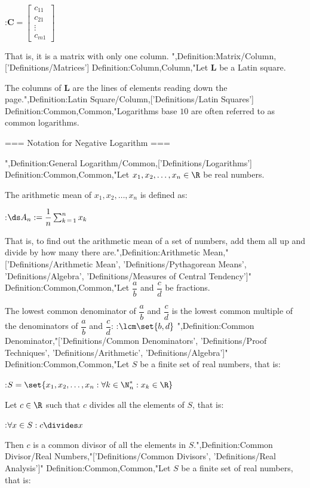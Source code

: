 :$\mathbf C = \begin {bmatrix} c_{1 1} \\ c_{2 1} \\ \vdots \\ c_{m 1} \end {bmatrix}$


That is, it is a matrix with only one column.
",Definition:Matrix/Column,['Definitions/Matrices']
Definition:Column,Column,"Let $\mathbf L$ be a Latin square.

The columns of $\mathbf L$ are the lines of elements reading down the page.",Definition:Latin Square/Column,['Definitions/Latin Squares']
Definition:Common,Common,"Logarithms base $10$ are often referred to as common logarithms.


=== Notation for Negative Logarithm ===

",Definition:General Logarithm/Common,['Definitions/Logarithms']
Definition:Common,Common,"Let $x_1, x_2, \ldots, x_n \in \R$ be real numbers.

The arithmetic mean of $x_1, x_2, \ldots, x_n$ is defined as:

:$\ds A_n := \dfrac 1 n \sum_{k \mathop = 1}^n x_k$

That is, to find out the arithmetic mean of a set of numbers, add them all up and divide by how many there are.",Definition:Arithmetic Mean,"['Definitions/Arithmetic Mean', 'Definitions/Pythagorean Means', 'Definitions/Algebra', 'Definitions/Measures of Central Tendency']"
Definition:Common,Common,"Let $\dfrac a b$ and $\dfrac c d$ be fractions.

The lowest common denominator of $\dfrac a b$ and $\dfrac c d$ is the lowest common multiple of the denominators of $\dfrac a b$ and $\dfrac c d$:
:$\lcm \set {b, d}$
",Definition:Common Denominator,"['Definitions/Common Denominators', 'Definitions/Proof Techniques', 'Definitions/Arithmetic', 'Definitions/Algebra']"
Definition:Common,Common,"Let $S$ be a finite set of real numbers, that is:

:$S = \set {x_1, x_2, \ldots, x_n: \forall k \in \N^*_n: x_k \in \R}$


Let $c \in \R$ such that $c$ divides all the elements of $S$, that is:

:$\forall x \in S: c \divides x$


Then $c$ is a common divisor of all the elements in $S$.",Definition:Common Divisor/Real Numbers,"['Definitions/Common Divisors', 'Definitions/Real Analysis']"
Definition:Common,Common,"Let $S$ be a finite set of real numbers, that is:

